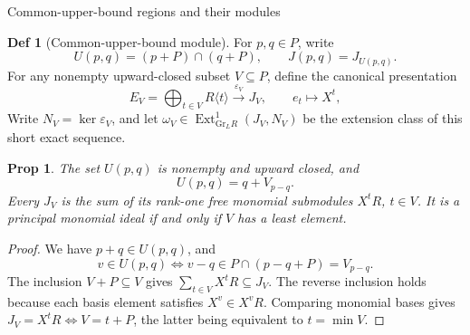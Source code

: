 \documentclass[10pt,letterpaper]{amsart}
\makeatletter
\numberwithin{equation}{section}
\newtheorem{prop}[thm]{Prop}
\theoremstyle{definition}
\newtheorem{defn}{Def}[section]
\newcommand{\Gr}{\mathrm{Gr}}
\newcommand{\Ext}{\operatorname{Ext}}
\newcommand{\sh}[1]{\langle #1\rangle}
\newcommand{\eps}{\varepsilon}
\def\subsection{\@startsection{subsection}{2}
  \z@{.9\linespacing\@plus.3\linespacing}{.4\linespacing}
  {\normalfont\fontsize{11.5}{14}\selectfont\bfseries\boldmath\raggedright}}
\makeatother
\begin{document}
\subsection{Common-upper-bound regions and their modules}
\begin{defn}[Common-upper-bound module]\label{def:upper-module}
For $p,q\in P$, write
\[
U(p,q)=(p+P)\cap(q+P),\qquad J(p,q)=J_{U(p,q)}.
\]
For any nonempty upward-closed subset $V\subseteq P$, define the canonical presentation
\[
E_V=\bigoplus_{t\in V}R\sh t\xrightarrow{\eps_V}J_V,
\qquad e_t\longmapsto X^t,
\]
Write $N_V=\ker\eps_V$, and let $\omega_V\in\Ext^1_{\Gr_LR}(J_V,N_V)$ be the extension class of this short exact sequence.
\end{defn}

\begin{prop}\label{prop:upper-system}
The set $U(p,q)$ is nonempty and upward closed, and
\[
U(p,q)=q+V_{p-q}.
\]
Every $J_V$ is the sum of its rank-one free monomial submodules $X^tR$, $t\in V$. It is a principal monomial ideal if and only if $V$ has a least element.
\end{prop}
\begin{proof}
We have $p+q\in U(p,q)$, and
\[
v\in U(p,q)\iff v-q\in P\cap(p-q+P)=V_{p-q}.
\]
The inclusion $V+P\subseteq V$ gives $\sum_{t\in V}X^tR\subseteq J_V$. The reverse inclusion holds because each basis element satisfies $X^v\in X^vR$.
Comparing monomial bases gives $J_V=X^tR\iff V=t+P$, the latter being equivalent to $t=\min V$.
\end{proof}
\end{document}
